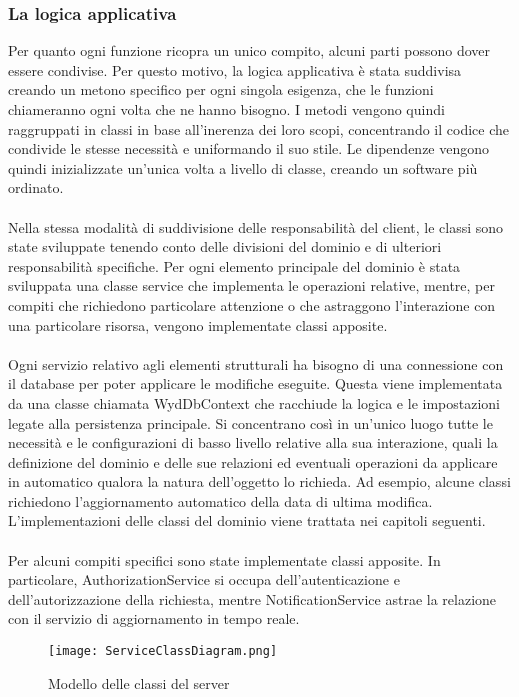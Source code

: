 \subsubsection{La logica applicativa}
Per quanto ogni funzione ricopra un unico compito, alcuni parti possono dover essere condivise.
Per questo motivo, la logica applicativa è stata suddivisa creando un metono specifico per ogni singola esigenza,
che le funzioni chiameranno ogni volta che ne hanno bisogno.
I metodi vengono quindi raggruppati in classi in base all'inerenza dei loro scopi, 
concentrando il codice che condivide le stesse necessità e uniformando il suo stile.
Le dipendenze vengono quindi inizializzate un'unica volta a livello di classe, creando un software più ordinato.\\
\\
Nella stessa modalità di suddivisione delle responsabilità del client, 
le classi sono state sviluppate tenendo conto delle divisioni del dominio e di ulteriori responsabilità specifiche. 
Per ogni elemento principale del dominio è stata sviluppata una classe service che implementa le operazioni relative,
mentre, per compiti che richiedono particolare attenzione o che astraggono l'interazione con una particolare risorsa, 
vengono implementate classi apposite.\\
\\
Ogni servizio relativo agli elementi strutturali ha bisogno di una connessione con il database per poter applicare le modifiche eseguite.
Questa viene implementata da una classe chiamata WydDbContext che racchiude la logica 
e le impostazioni legate alla persistenza principale.
Si concentrano così in un'unico luogo tutte le necessità e le configurazioni di basso livello relative alla sua interazione,
quali la definizione del dominio e delle sue relazioni ed 
eventuali operazioni da applicare in automatico qualora la natura dell'oggetto lo richieda.
Ad esempio, alcune classi richiedono l'aggiornamento automatico della data di ultima modifica.
L'implementazioni delle classi del dominio viene trattata nei capitoli seguenti.\\
\\
Per alcuni compiti specifici sono state implementate classi apposite.
In particolare, AuthorizationService si occupa dell'autenticazione e dell'autorizzazione della richiesta,
mentre NotificationService astrae la relazione con il servizio di aggiornamento in tempo reale.
\clearpage
\begin{figure}[h!]
    \begin{center}
        \texttt{[image: ServiceClassDiagram.png]}
        \caption{Modello delle classi del server}
    \end{center}
\end{figure}
